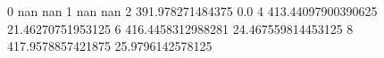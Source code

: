 0 nan nan
1 nan nan
2 391.978271484375 0.0
4 413.44097900390625 21.46270751953125
6 416.4458312988281 24.467559814453125
8 417.9578857421875 25.9796142578125
